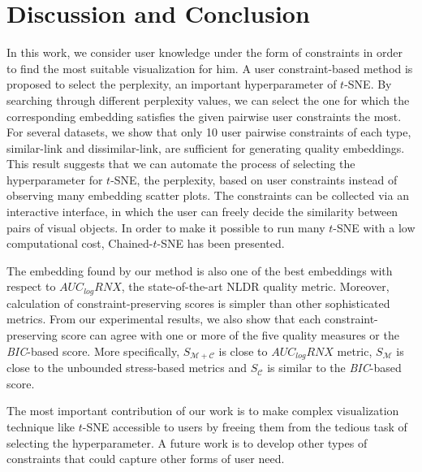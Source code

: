 \section{Discussion and Conclusion}\label{sec:ccl}

In this work, we consider user knowledge under the form of constraints in order to find the most suitable visualization for him. A user constraint-based method is proposed to select the perplexity, an important hyperparameter of $t$-SNE. By searching through different perplexity values, we can select the one for which the corresponding embedding satisfies the given pairwise user constraints the most.
For several datasets, we show that only 10 user pairwise constraints of each type, similar-link and dissimilar-link, are sufficient for generating quality embeddings.
This result suggests that we can automate the process of selecting the hyperparameter for $t$-SNE, the perplexity, based on user constraints instead of observing many embedding scatter plots.
The constraints can be collected via an interactive interface, in which the user can freely decide the similarity between pairs of visual objects. In order to make it possible to run many $t$-SNE with a low computational cost, Chained-$t$-SNE has been presented. 

The embedding found by our method is also one of the best embeddings with respect to $AUC_{log}RNX$, the state-of-the-art NLDR quality metric.
Moreover, calculation of constraint-preserving scores is simpler than other sophisticated metrics.
From our experimental results, we also show that each constraint-preserving score can agree with one or more of the five quality measures or the \emph{BIC}-based score. More specifically, $S_{\mathcal{M}+\mathcal{C}}$ is close to $AUC_{log}RNX$ metric, $S_{\mathcal{M}}$ is close to the unbounded stress-based metrics and $S_{\mathcal{C}}$ is similar to the \emph{BIC}-based score.

The most important contribution of our work is to make complex visualization technique like $t$-SNE accessible to users by freeing them from the tedious task of selecting the hyperparameter.
A future work is to develop other types of constraints that could capture other forms of user need. 
